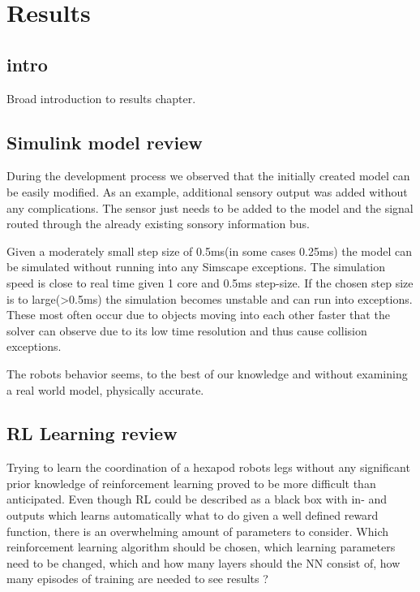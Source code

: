 \chapter{Results}
\label{ch:results}

\section{intro}
Broad introduction to results chapter.




\section{Simulink model review}
During the development process we observed that the initially created model can be easily modified.
As an example, additional sensory output was added without any complications.
The sensor just needs to be added to the model and the signal routed through the already existing sonsory information bus.

Given a moderately small step size of 0.5ms(in some cases 0.25ms) the model can be simulated without running into any Simscape exceptions.
The simulation speed is close to real time given 1 core and 0.5ms step-size.
If the chosen step size is to large(>0.5ms) the simulation becomes unstable and can run into exceptions.
These most often occur due to objects moving into each other faster that the solver can observe due to its low time resolution and thus cause collision exceptions.

The robots behavior seems, to the best of our knowledge and without examining a real world model, physically accurate.





\section{RL Learning review}

Trying to learn the coordination of a hexapod robots legs without any significant prior knowledge of reinforcement learning proved to be more difficult than anticipated.
Even though RL could be described as a black box with in- and outputs which learns automatically what to do given a well defined reward function, there is an overwhelming amount of parameters to consider.
Which reinforcement learning algorithm should be chosen, which learning parameters need to be changed, which and how many layers should the NN consist of, how many episodes of training are needed to see results ?


